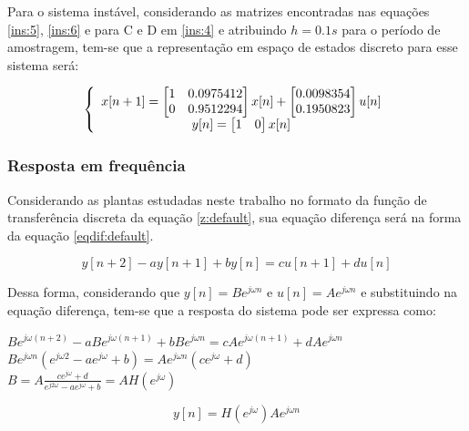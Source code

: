 Para o sistema instável, considerando as matrizes encontradas nas equações \ref{ins:5}, \ref{ins:6} e para C e D em \ref{ins:4} e atribuindo $h = 0.1 s$ para o período de amostragem, tem-se que a representação em espaço de estados discreto para esse sistema será:

\begin{equation} \label{ss:ins}
\centering
\left \{
\begin{array}{cc}
x[n+1] = \begin{bmatrix} 1 & 0.0975412 \\ 0 & 0.9512294 \end{bmatrix} x[n] + \begin{bmatrix} 0.0098354 \\ 0.1950823 \end{bmatrix} u[n] \\
y[n] = \begin{bmatrix} 1 & 0  \end{bmatrix} x[n] \\
\end{array}
\right.
\end{equation}


\subsubsection{Resposta em frequência}

Considerando as plantas estudadas neste trabalho no formato da função de transferência discreta da equação \ref{z:default}, sua equação diferença será na forma da equação \ref{eqdif:default}.

\begin{equation} \label{eqdif:default}
    y[n+2]-ay[n+1]+by[n]=cu[n+1]+du[n]
\end{equation}

Dessa forma, considerando que $y[n] = Be^{j\omega n}$ e $u[n] = Ae^{j\omega n}$ e substituindo na equação diferença, tem-se que a resposta do sistema pode ser expressa como:

\begin{center}
    $Be^{j \omega (n+2)} - aBe^{j \omega (n+1)} + bBe^{j \omega n} = cAe^{j \omega (n+1)} + dAe^{j \omega n} $\vspace{4pt}\\
    $Be^{j \omega n} (e^{j \omega 2} - ae^{j \omega } + b) = Ae^{j \omega n} (ce^{j \omega } + d)$ \vspace{4pt}\\
    $B = A \frac{ce^{j \omega}+d}{e^{j 2\omega} - ae^{j \omega} + b} = A H(e^{j \omega})$ \vspace{4pt}\\
\end{center}
\begin{equation} \label{freqrep:y}
    y[n] = H(e^{j \omega}) Ae^{j \omega n}
\end{equation}


